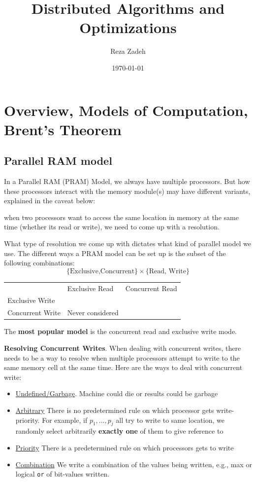 \documentclass[11pt]{article}
\author{Reza Zadeh}
\date{\today}
\title{Distributed Algorithms and Optimizations}
\begin{document}
\maketitle
\tableofcontents


\section{Overview, Models of Computation, Brent's Theorem}
\label{sec:orgfa8fec2}
\subsection{Parallel RAM model}
\label{sec:org9653dac}
In a Parallel RAM (PRAM) Model, we always have multiple processors. But how these processors
interact with the memory module(s) may have different variants, explained in the caveat below:

\begin{center}
when two processors want to access the same location in memory at the same time (whether its
read or write), we need to come up with a resolution.
\end{center}

What type of resolution we come up with dictates what kind of parallel model we use. The
different ways a PRAM model can be set up is the subset of the following combinations:
\begin{equation*}
\{\text{Exclusive,Concurrent}\}\times\{\text{Read, Write}\}
\end{equation*}

\begin{center}
\begin{tabular}{lll}
 & Exclusive Read & Concurrent Read\\
Exclusive Write &  & \\
Concurrent Write & Never considered & \\
\end{tabular}
\end{center}

The \textbf{most popular model} is the concurrent read and exclusive write mode.

\textbf{Resolving Concurrent Writes}. When dealing with concurrent writes, there needs to be a way to
 resolve when multiple processors attempt to write to the same memory cell at the same time.
 Here are the ways to deal with concurrent write:
\begin{itemize}
\item \uline{Undefined/Garbage}. Machine could die or results could be garbage
\item \uline{Arbitrary} There is no predetermined rule on which processor gets write-priority. For example,
if \(p_1,\dots,p_j\) all try to write to same location, we randomly select arbitrarily \textbf{exactly one}
of them to give reference to
\item \uline{Priority} There is a predetermined rule on which processors gets to write
\item \uline{Combination} We write a combination of the values being written, e.g., max or logical \texttt{or} of
bit-values written.
\end{itemize}
\end{document}
